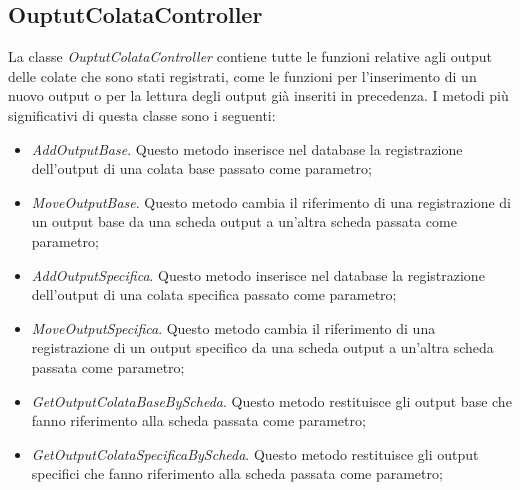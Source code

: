   \subsection{OuptutColataController}
  La classe \textit{OuptutColataController} contiene tutte le funzioni relative agli output delle colate che sono stati registrati,
  come le funzioni per l'inserimento di un nuovo output o per la lettura degli output già inseriti in precedenza. I metodi più significativi
  di questa classe sono i seguenti:
  \begin{itemize}
    \item \textit{AddOutputBase}. Questo metodo inserisce nel database la registrazione dell'output di una colata base
    passato come parametro;
    \item \textit{MoveOutputBase}. Questo metodo cambia il riferimento di una registrazione di un output base da una
    scheda output a un'altra scheda passata come parametro;
    \item \textit{AddOutputSpecifica}. Questo metodo inserisce nel database la registrazione dell'output di una colata
    specifica passato come parametro;
    \item \textit{MoveOutputSpecifica}. Questo metodo cambia il riferimento di una registrazione di un output specifico
    da una scheda output a un'altra scheda passata come parametro;
    \item \textit{GetOutputColataBaseByScheda}. Questo metodo restituisce gli output base che fanno riferimento alla
    scheda passata come parametro;
    \item \textit{GetOutputColataSpecificaByScheda}. Questo metodo restituisce gli output specifici che fanno riferimento alla
    scheda passata come parametro;
  \end{itemize}

